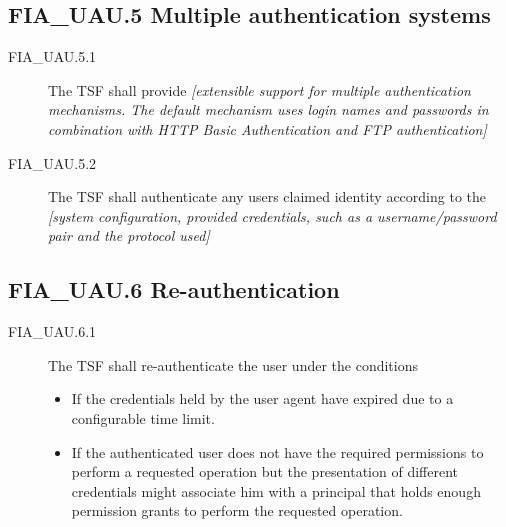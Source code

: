 \documentclass[12pt,english]{scrbook}
\begin{document}
\subsection{FIA{\_}UAU.5 Multiple authentication systems}
\begin{description}
\item[FIA{\_}UAU.5.1 ]

The TSF shall provide \emph{{[}extensible support for multiple
authentication mechanisms. The default mechanism uses login names
and passwords in combination with HTTP Basic Authentication and FTP
authentication]}

\item[FIA{\_}UAU.5.2]

The TSF shall authenticate any users claimed identity according to
the \emph{{[}system configuration, provided credentials, such as a
username/password pair and the protocol used]}

\end{description}





\subsection{FIA{\_}UAU.6 Re-authentication}
\begin{description}
\item[FIA{\_}UAU.6.1 ]

The TSF shall re-authenticate the user under the conditions
\begin{itemize}
\item {} 
If the credentials held by the user agent have expired due to
a configurable time limit.

\item {} 
If the authenticated user does not have the required permissions to
perform a requested operation but the presentation of different
credentials might associate him with a principal that holds enough
permission grants to perform the requested operation.

\end{itemize}

\end{description}
\end{document}
